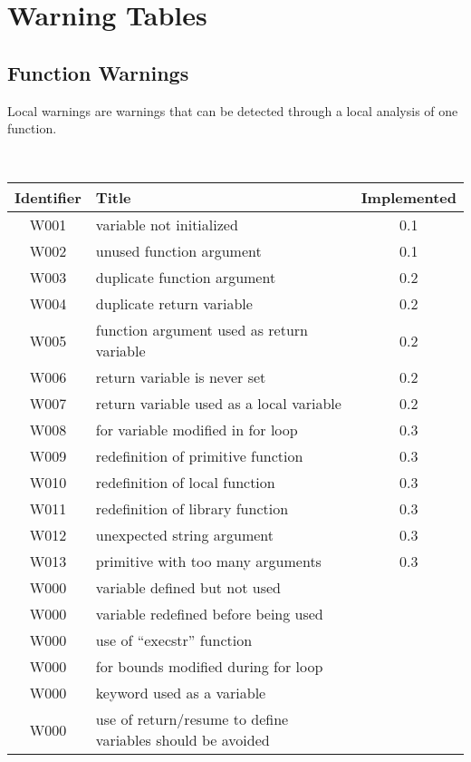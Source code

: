 \section{Warning Tables}

\subsection{Function Warnings}



Local warnings are warnings that can be detected through a local analysis of
one function.



\noindent\\\begin{tabular}{|c|p{8cm}|c|} \hline
Identifier & Title & Implemented      \\ \hline
W001 & variable not initialized & 0.1 \\ \hline
W002 & unused function argument & 0.1 \\ \hline
W003 & duplicate function argument & 0.2 \\ \hline
W004 & duplicate return variable   & 0.2 \\ \hline
W005 & function argument used as return variable   & 0.2 \\ \hline
W006 & return variable is never set & 0.2 \\ \hline
W007 & return variable used as a local variable & 0.2 \\ \hline
W008 & for variable modified in for loop & 0.3 \\ \hline
W009 & redefinition of primitive function & 0.3 \\ \hline
W010 & redefinition of local function & 0.3 \\ \hline
W011 & redefinition of library function & 0.3 \\ \hline
W012 & unexpected string argument & 0.3 \\ \hline
W013 & primitive with too many arguments & 0.3 \\ \hline
W000 & variable defined but not used &  \\ \hline
W000 & variable redefined before being used &  \\ \hline
W000 & use of ``execstr'' function      &  \\ \hline
W000 & for bounds modified during for loop &  \\ \hline
W000 & keyword used as a variable &  \\ \hline
W000 & use of return/resume to define variables should be avoided &  \\ \hline

\end{tabular}
